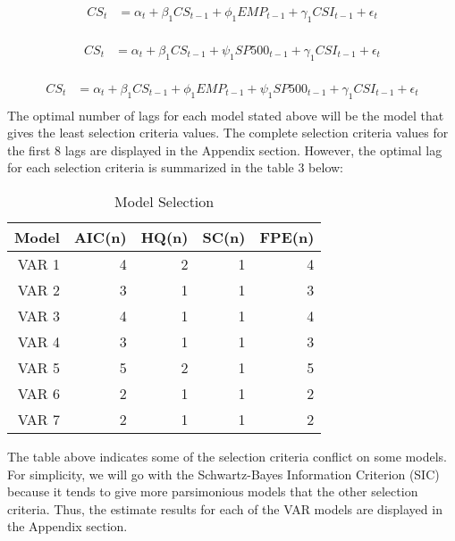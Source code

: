 \documentclass[12pt]{article}
\newcommand{\newpar}{\vspace{0.15in} \noindent}
\begin{document}
\begin{equation} 
\begin{split}
CS_{t} & = \alpha_t + \beta_1CS_{t-1} + \phi_1EMP_{t-1} + \gamma_1CSI_{t-1}  + \epsilon_t\\
\end{split}
\end{equation}

\begin{equation} 
\begin{split}
CS_{t} & = \alpha_t + \beta_1CS_{t-1} + \psi_1SP500_{t-1} + \gamma_1CSI_{t-1}  + \epsilon_t\\
\end{split}
\end{equation}

\begin{equation} 
\begin{split}
CS_{t} & = \alpha_t + \beta_1CS_{t-1} + \phi_1EMP_{t-1} + \psi_1SP500_{t-1} + \gamma_1CSI_{t-1}  + \epsilon_t\\
\end{split}
\end{equation}
\newpar
\newline
The optimal number of lags for each model stated above will be the model that gives the least selection criteria values. The complete selection criteria values for the first 8 lags are displayed in the Appendix section. However, the optimal lag for each selection criteria is summarized in the table 3 below: 
\newpar
\newpar
\newpar
\newpar
\newpar
\newpar
\newpar
\begin{table}[ht]
\centering
\begin{tabular}{|r|r|r|r|r|}
  \hline
 Model & AIC(n) & HQ(n) & SC(n) & FPE(n) \\ 
  \hline
VAR 1 & 4 & 2 & 1 & 4 \\
 \hline
VAR 2 & 3 & 1 & 1 & 3\\
 \hline
VAR 3 & 4 & 1 & 1 & 4\\
   \hline
VAR 4 & 3 & 1 & 1 & 3\\
   \hline
VAR 5 & 5 & 2 & 1 & 5\\
   \hline
VAR 6 & 2 & 1 & 1 & 2\\
   \hline
VAR 7 & 2 & 1 & 1 & 2\\
   \hline
\end{tabular}
\caption{Model Selection}
\end{table}

The table above indicates some of the selection criteria conflict on some models. For simplicity, we will go with the Schwartz-Bayes Information Criterion (SIC) because it tends to give more parsimonious models that the other selection criteria. Thus, the estimate results for each of the VAR models are displayed in the Appendix section. 
\end{document}
